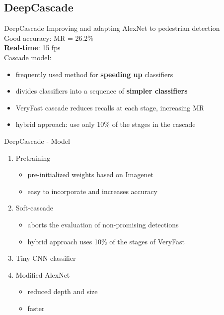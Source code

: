 \subsection{DeepCascade}
\begin{frame}{DeepCascade}
  \small
  Improving and adapting AlexNet to pedestrian detection\\
  Good accuracy: MR = $26.2\%$\\
  \textbf{Real-time}: 15 fps\\
  Cascade model:
  \begin{itemize}
    \item frequently used method for \textbf{speeding up} classifiers
    \item divides classifiers into a sequence of \textbf{simpler classifiers}
    \item VeryFast cascade reduces recalls at each stage, increasing MR
    \item hybrid approach: use only 10\% of the stages in the cascade
  \end{itemize}
\end{frame}

\begin{frame}{DeepCascade - Model}
\small
\begin{enumerate}
  \item Pretraining
  \begin{itemize}
    \item pre-initialized weights based on Imagenet
    \item easy to incorporate and increases accuracy
  \end{itemize}

  \item Soft-cascade
  \begin{itemize}
    \item aborts the evaluation of non-promising detections
    \item hybrid approach uses 10\% of the stages of VeryFast
  \end{itemize}

  \item Tiny CNN classifier

  \item Modified AlexNet
  \begin{itemize}
    \item reduced depth and size
    \item faster
  \end{itemize}
\end{enumerate}
\end{frame}

